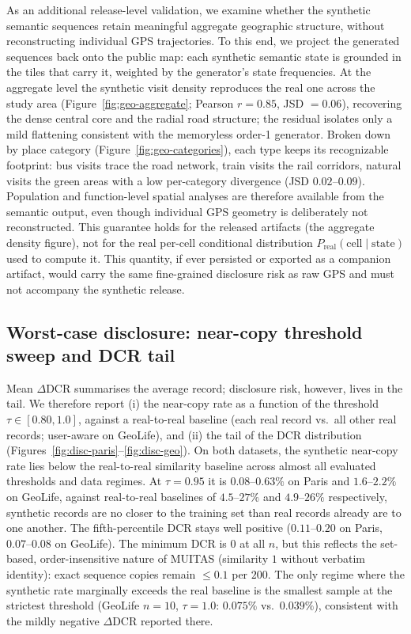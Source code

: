 \documentclass[sigconf,nonacm]{acmart}
\begin{document}
As an additional release-level validation, we examine whether the synthetic semantic sequences retain meaningful aggregate geographic structure, without reconstructing individual GPS trajectories.
To this end, we project the generated
sequences back onto the public map: each synthetic semantic state is grounded in the tiles that
carry it, weighted by the generator's state frequencies. At the aggregate level the synthetic
visit density reproduces the real one across the study area (Figure~\ref{fig:geo-aggregate};
Pearson $r{=}0.85$, JSD $=0.06$), recovering the dense central core and the radial road structure;
the residual isolates only a mild flattening consistent with the memoryless order-1 generator.
Broken down by place category (Figure~\ref{fig:geo-categories}), each type keeps its recognizable
footprint: bus visits trace the road network, train visits the rail corridors, natural visits
the green areas with a low per-category divergence (JSD $0.02$--$0.09$). Population and
function-level spatial analyses are therefore available from the semantic output, even though
individual GPS geometry is deliberately not reconstructed.
This guarantee holds for the released artifacts (the aggregate density figure), not for the real per-cell conditional distribution $P_{\text{real}}(\text{cell}\mid\text{state})$ used to compute it. This quantity, if ever persisted or exported as a companion artifact, would carry the same fine-grained disclosure risk as raw GPS and must not accompany the synthetic release.


\subsection{Worst-case disclosure: near-copy threshold sweep and DCR tail}
\label{sec:disclosure-tail}
Mean $\Delta$DCR summarises the average record; disclosure risk, however, lives in the tail. We
therefore report (i) the near-copy rate as a function of the threshold $\tau\in[0.80,1.0]$, against
a real-to-real baseline (each real record vs.\ all other real records; user-aware on GeoLife), and
(ii) the tail of the DCR distribution (Figures~\ref{fig:disc-paris}--\ref{fig:disc-geo}). 
On both datasets, the synthetic near-copy rate lies below the real-to-real similarity baseline across almost all evaluated thresholds and data regimes.
At $\tau{=}0.95$ it is $0.08$--$0.63\%$ on Paris and $1.6$--$2.2\%$ on GeoLife, against
real-to-real baselines of $4.5$--$27\%$ and $4.9$--$26\%$ respectively, synthetic records are no
closer to the training set than real records already are to one another. The fifth-percentile DCR
stays well positive ($0.11$--$0.20$ on Paris, $0.07$--$0.08$ on GeoLife). The minimum DCR is $0$ at
all $n$, but this reflects the set-based, order-insensitive nature of MUITAS (similarity $1$ without
verbatim identity): exact sequence copies remain $\le 0.1$ per $200$. The only regime where the
synthetic rate marginally exceeds the real baseline is the smallest sample at the strictest
threshold (GeoLife $n{=}10$, $\tau{=}1.0$: $0.075\%$ vs.\ $0.039\%$), consistent with the mildly
negative $\Delta$DCR reported there.
\end{document}
